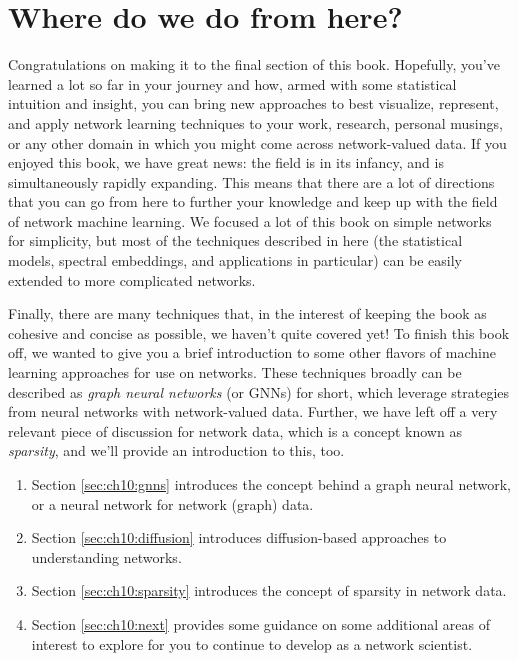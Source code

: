 \chapter{Where do we do from here?}
\label{sec:ch10}

Congratulations on making it to the final section of this book. Hopefully, you've learned a lot so far in your journey and how, armed with some statistical intuition and insight, you can bring new approaches to best visualize, represent, and apply network learning techniques to your work, research, personal musings, or any other domain in which you might come across network-valued data. If you enjoyed this book, we have great news: the field is in its infancy, and is simultaneously rapidly expanding. This means that there are a lot of directions that you can go from here to further your knowledge and keep up with the field of network machine learning. We focused a lot of this book on simple networks for simplicity, but most of the techniques described in here (the statistical models, spectral embeddings, and applications in particular) can be easily extended to more complicated networks. 

Finally, there are many techniques that, in the interest of keeping the book as cohesive and concise as possible, we haven't quite covered yet! To finish this book off, we wanted to give you a brief introduction to some other flavors of machine learning approaches for use on networks. These techniques broadly can be described as \textit{graph neural networks} (or GNNs) for short, which leverage strategies from neural networks with network-valued data. Further, we have left off a very relevant piece of discussion for network data, which is a concept known as \textit{sparsity}, and we'll provide an introduction to this, too. 

\begin{enumerate}
    \item Section \ref{sec:ch10:gnns} introduces the concept behind a graph neural network, or a neural network for network (graph) data.
    \item Section \ref{sec:ch10:diffusion} introduces diffusion-based approaches to understanding networks.
    \item Section \ref{sec:ch10:sparsity} introduces the concept of sparsity in network data.
    \item Section \ref{sec:ch10:next} provides some guidance on some additional areas of interest to explore for you to continue to develop as a network scientist.
\end{enumerate}


